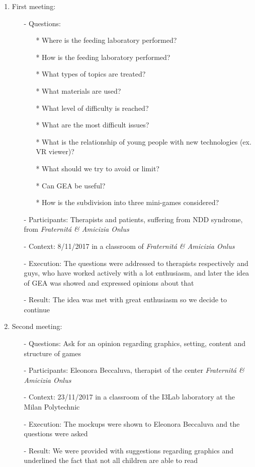 \begin{enumerate}
\item First meeting: 
\begin{itemize}
\item[-] Questions:
\begin{itemize}
\item[*]Where is the feeding laboratory performed?
\item[*]How is the feeding laboratory performed?
\item[*]What types of topics are treated?
\item[*]What materials are used?
\item[*]What level of difficulty is reached?
\item[*]What are the most difficult issues?
\item[*]What is the relationship of young people with new technologies (ex.
VR viewer)?
\item[*]What should we try to avoid or limit?
\item[*]Can GEA be useful?
\item[*]How is the subdivision into three mini-games considered?
\end{itemize} 
\item[-]Participants: Therapists and patients, suffering from NDD syndrome, from \textit{Fraternit\'a \& Amicizia Onlus}
\item[-]Context: 8/11/2017 in a classroom of \textit{Fraternit\'a \& Amicizia Onlus}
\item[-]Execution: The questions were addressed to therapists respectively and guys, who have worked actively with a lot enthusiasm, and later the idea of GEA was showed and expressed opinions about that
\item[-]Result: The idea was met with great enthusiasm so we decide to continue
\end{itemize}
\item Second meeting:
\begin{itemize}
\item[-]Questions: Ask for an opinion regarding graphics, setting, content and structure of games
\item[-]Participants: Eleonora Beccaluva, therapist of the center \textit{Fraternit\'a \& Amicizia Onlus}
\item[-]Context: 23/11/2017 in a classroom of the I3Lab laboratory at the Milan Polytechnic
\item[-]Execution: The mockups were shown to Eleonora Beccaluva and the questions were asked
\item[-]Result: We were provided with suggestions regarding graphics and underlined the fact that not all children are able to read
\end{itemize}
\end{enumerate}
